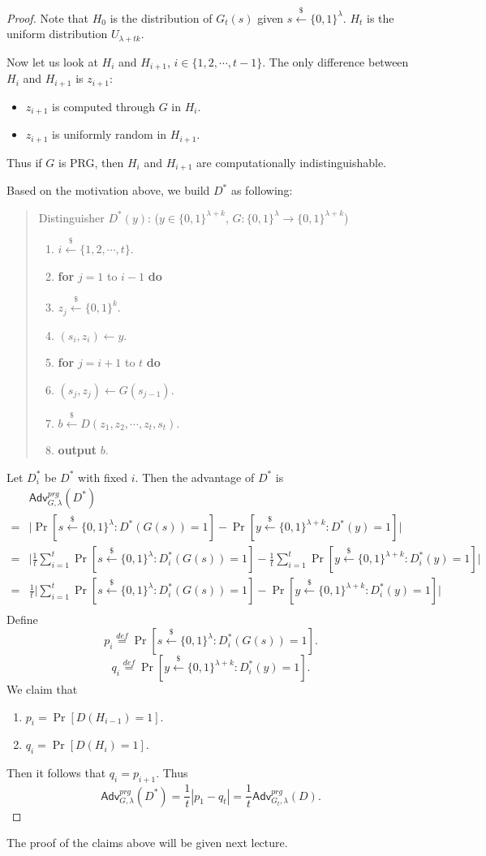 \documentclass[12pt]{article}
\newcommand{\eqdef}{\stackrel{def}{=}}
\newcommand{\bits}{\{0,1\}}
\newcommand{\getsr}{\stackrel{\$}{\gets}}
\newcommand{\Adv}{\mathsf{Adv}}
\newcommand{\tab}{\hspace{0.3in}}
\theoremstyle{definition}
\begin{document}
\begin{proof}
Note that $H_0$ is the distribution of $G_t(s)$ given $s \getsr \bits^\lambda$. $H_t$ is the uniform distribution $U_{\lambda+tk}$.

Now let us look at $H_i$ and $H_{i+1}$, $i \in \{1, 2, \cdots, t-1\}$. The only difference between $H_i$ and $H_{i+1}$ is $z_{i+1}$:
\begin{itemize}
\item $z_{i+1}$ is computed through $G$ in $H_i$.
\item $z_{i+1}$ is uniformly random in $H_{i+1}$.
\end{itemize}
Thus if $G$ is PRG, then $H_i$ and $H_{i+1}$ are computationally indistinguishable.

Based on the motivation above, we build $D^*$ as following:
\begin{quote}
Distinguisher $D^* (y)$: ($y \in \bits^{\lambda+k}$, $G : \bits^\lambda \to \bits^{\lambda+k}$)
\begin{enumerate}
\item $i \getsr \{1, 2, \cdots, t\}$.
\item {\bf for} $j=1$ to $i-1$ {\bf do}
\item \tab $z_j \getsr \bits^k$.
\item $(s_i, z_i) \gets y$.
\item {\bf for} $j=i+1$ to $t$ {\bf do}
\item \tab $(s_j, z_j) \gets G(s_{j-1})$.
\item $b \getsr D(z_1, z_2, \cdots, z_t, s_t)$.
\item {\bf output} $b$.
\end{enumerate}
\end{quote}
Let $D_i^*$ be $D^*$ with fixed $i$. Then the advantage of $D^*$ is
$$\begin{aligned}
&\Adv_{G,\lambda}^{prg}(D^*) \\
=& \bigg| \Pr[s \getsr \bits^\lambda : D^*(G(s)) = 1] - \Pr[y \getsr \bits^{\lambda+k} : D^*(y) = 1] \bigg| \\
=& \bigg| \frac{1}{t}\sum_{i=1}^t \Pr[s \getsr \bits^\lambda : D_i^*(G(s)) = 1] - \frac{1}{t}\sum_{i=1}^t \Pr[y \getsr \bits^{\lambda+k} : D_i^*(y) = 1] \bigg| \\
=& \frac{1}{t}\bigg| \sum_{i=1}^t \Pr[s \getsr \bits^\lambda : D_i^*(G(s)) = 1] - \Pr[y \getsr \bits^{\lambda+k} : D_i^*(y) = 1] \bigg| \\
\end{aligned}$$
Define
$$p_i \eqdef \Pr[s \getsr \bits^\lambda : D_i^*(G(s)) = 1].$$
$$q_i \eqdef \Pr[y \getsr \bits^{\lambda+k} : D_i^*(y) = 1].$$
We claim that
\begin{enumerate}
\item $p_i = \Pr[D(H_{i-1}) = 1]$.
\item $q_i = \Pr[D(H_i) = 1]$.
\end{enumerate}
Then it follows that $q_i = p_{i+1}$. Thus
$$\Adv_{G,\lambda}^{prg}(D^*) = \frac{1}{t}|p_1 - q_t| = \frac{1}{t} \Adv_{G_t, \lambda}^{prg}(D).$$
\end{proof}
The proof of the claims above will be given next lecture.
\end{document}
